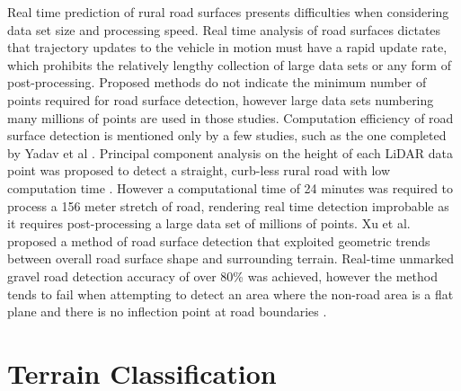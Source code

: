 \documentclass[numbered,pdftex]{ohio-etd}
\begin{document}
{{		{Real time prediction of rural road surfaces presents difficulties when considering data set size and processing speed. Real time analysis of road surfaces dictates that trajectory updates to the vehicle in motion must have a rapid update rate, which prohibits the relatively lengthy collection of large data sets or any form of post-processing. Proposed methods \cite{yadav_extraction_2017,yadav_road_2018,yadav_rural_2018,yadav_pole-shaped_2015,miyazaki_line-based_2014,yang_semi-automated_2013,liu_new_2013,qiu_fast_2016} do not indicate the minimum number of points required for road surface detection, however large data sets numbering many millions of points are used in those studies. Computation efficiency of road surface detection is mentioned only by a few studies, such as the one completed by Yadav et al \cite{yadav_road_2018}. Principal component analysis on the height of each LiDAR data point was proposed to detect a straight, curb-less rural road with low computation time \cite{yadav_road_2018}. However a computational time of 24 minutes was required to process a 156 meter stretch of road, rendering real time detection improbable as it requires post-processing a large data set of millions of points. Xu et al. proposed a method of road surface detection that exploited geometric trends between overall road surface shape and surrounding terrain. Real-time unmarked gravel road detection accuracy of over 80\% was achieved, however the method tends to fail when attempting to detect an area where the non-road area is a flat plane and there is no inflection point at road boundaries \cite{xu_real-time_2019}. } 
					
	} %
	
%	
%	

	
	\section{Terrain Classification}{
		
}}
\end{document}
